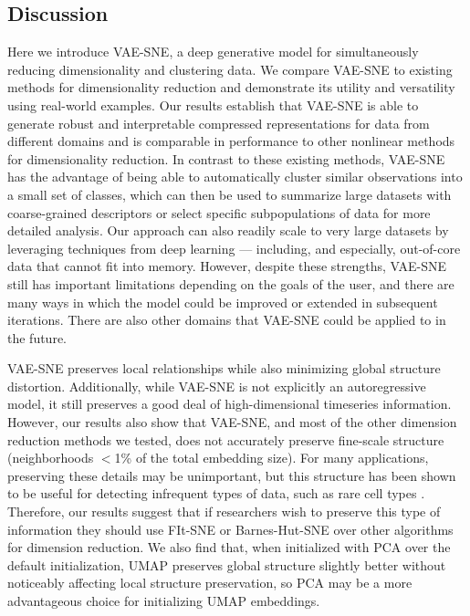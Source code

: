 \documentclass[11pt,a4paper,twoside]{book}
\begin{document}
\begin{doublespace}
\section{Discussion}
Here we introduce VAE-SNE, a deep generative model for simultaneously reducing dimensionality and clustering data. We compare VAE-SNE to existing methods for dimensionality reduction and demonstrate its utility and versatility using real-world examples. Our results establish that VAE-SNE is able to generate robust and interpretable compressed representations for data from different domains and is comparable in performance to other nonlinear methods for dimensionality reduction. In contrast to these existing methods, VAE-SNE has the advantage of being able to automatically cluster similar observations into a small set of classes, which can then be used to summarize large datasets with coarse-grained descriptors or select specific subpopulations of data for more detailed analysis. Our approach can also readily scale to very large datasets by leveraging techniques from deep learning --- including, and especially, out-of-core data that cannot fit into memory. However, despite these strengths, VAE-SNE still has important limitations depending on the goals of the user, and there are many ways in which the model could be improved or extended in subsequent iterations. There are also other domains that VAE-SNE could be applied to in the future.

VAE-SNE preserves local relationships while also minimizing global structure distortion. Additionally, while VAE-SNE is not explicitly an autoregressive model, it still preserves a good deal of high-dimensional timeseries information. However, our results also show that VAE-SNE, and most of the other dimension reduction methods we tested, does not accurately preserve fine-scale structure (neighborhoods $<$1\% of the total embedding size). For many applications, preserving these details may be unimportant, but this structure has been shown to be useful for detecting infrequent types of data, such as rare cell types \citep{linderman2019fast}. Therefore, our results suggest that if researchers wish to preserve this type of information they should use FIt-SNE \citep{linderman2017efficient, linderman2019fast} or Barnes-Hut-SNE \citep{van2014accelerating} over other algorithms for dimension reduction. We also find that, when initialized with PCA over the default initialization, UMAP \citep{mcinnes2018umap} preserves global structure slightly better without noticeably affecting local structure preservation, so PCA may be a more advantageous choice for initializing UMAP embeddings.


\end{doublespace}
\end{document}
